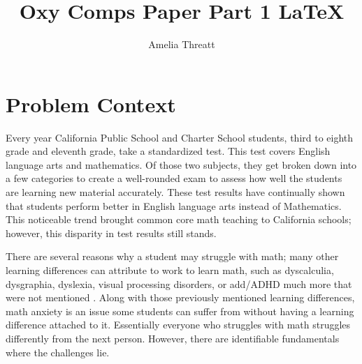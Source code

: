\documentclass[10pt,twocolumn]{article}
\title{Oxy Comps Paper Part 1 \LaTeX}
\author{Amelia Threatt}
\affiliation{Occidental College}
\begin{document}
\maketitle

\section{Problem Context}
Every year California Public School and Charter School students, third to eighth grade and eleventh grade, take a standardized test. This test covers English language arts and mathematics. Of those two subjects, they get broken down into a few categories to create a well-rounded exam to assess how well the students are learning new material accurately. These test results have continually shown that students perform better in English language arts instead of Mathematics. This noticeable trend brought common core math teaching to California schools; however, this disparity in test results still stands. \cite{noauthor_california_nodate}
 
There are several reasons why a student may struggle with math; many other learning differences can attribute to work to learn math, such as dyscalculia, dysgraphia, dyslexia, visual processing disorders, or add/ADHD much more that were not mentioned \cite{noauthor_why_nodate}. Along with those previously mentioned learning differences, math anxiety is an issue some students can suffer from without having a learning difference attached to it. Essentially everyone who struggles with math struggles differently from the next person. However, there are identifiable fundamentals where the challenges lie.  
 
\end{document}
